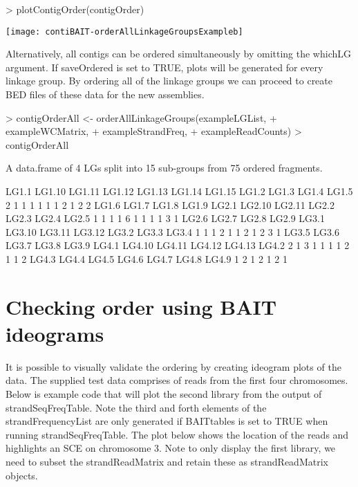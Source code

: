 \documentclass{article}
\begin{document}
\begin{Schunk}
\begin{Sinput}
> plotContigOrder(contigOrder)
\end{Sinput}
\end{Schunk}
\texttt{[image: contiBAIT-orderAllLinkageGroupsExampleb]}

Alternatively, all contigs can be ordered simultaneously by omitting the whichLG argument. If saveOrdered is set to TRUE, plots will be generated for every linkage group.  By ordering all of the linkage groups we can proceed to create BED files of these data for the new assemblies.

\begin{Schunk}
\begin{Sinput}
> contigOrderAll <- orderAllLinkageGroups(exampleLGList,
+ exampleWCMatrix,
+ exampleStrandFreq,
+ exampleReadCounts)
> contigOrderAll
\end{Sinput}
\begin{Soutput}
A data.frame of 4 LGs split into 15 sub-groups from 75 ordered fragments.

 LG1.1 LG1.10 LG1.11 LG1.12 LG1.13 LG1.14 LG1.15  LG1.2  LG1.3  LG1.4  LG1.5 
     2      1      1      1      1      1      1      2      1      2      2 
 LG1.6  LG1.7  LG1.8  LG1.9  LG2.1 LG2.10 LG2.11  LG2.2  LG2.3  LG2.4  LG2.5 
     1      1      1      1      6      1      1      1      1      3      1 
 LG2.6  LG2.7  LG2.8  LG2.9  LG3.1 LG3.10 LG3.11 LG3.12  LG3.2  LG3.3  LG3.4 
     1      1      1      2      1      1      2      1      2      3      1 
 LG3.5  LG3.6  LG3.7  LG3.8  LG3.9  LG4.1 LG4.10 LG4.11 LG4.12 LG4.13  LG4.2 
     2      1      3      1      1      1      1      2      1      1      2 
 LG4.3  LG4.4  LG4.5  LG4.6  LG4.7  LG4.8  LG4.9 
     1      2      1      2      1      2      1 
\end{Soutput}
\end{Schunk}


\section{Checking order using BAIT ideograms}

It is possible to visually validate the ordering by creating ideogram plots of the data. The supplied test data comprises of reads from the first four chromosomes. Below is example code that will plot the second library from the output of strandSeqFreqTable. Note the third and forth elements of the strandFrequencyList are only generated if BAITtables is set to TRUE when running strandSeqFreqTable.  The plot below shows the location of the reads and highlights an SCE on chromosome 3. Note to only display the first library, we need to subset the strandReadMatrix and retain these as strandReadMatrix objects.
\end{document}
